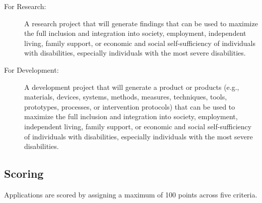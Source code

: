 \begin{description}
\item[For Research:] A research project that will generate findings that can be used to maximize the full inclusion and integration into society, employment, independent living, family support, or economic and social self-sufficiency of individuals with disabilities, especially individuals with the most severe disabilities.
\item[For Development:] A development project that will generate a product or products (e.g., materials, devices, systems, methods, measures, techniques, tools, prototypes, processes, or intervention protocols) that can be used to maximize the full inclusion and integration into society, employment, independent living, family support, or economic and social self-sufficiency of individuals with disabilities, especially individuals with the most severe disabilities.
\end{description}

\subsection{Scoring}
Applications are scored by assigning a maximum of 100 points across five criteria. 

